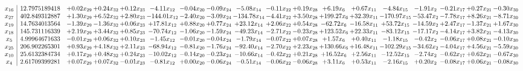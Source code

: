 \documentclass[9pt]{article}
\begin{document}
 \[\begin{array}{c| c c@{\hskip 2pt} c@{\hskip 2pt} c@{\hskip 2pt} c@{\hskip 2pt} c@{\hskip 2pt} c@{\hskip 2pt} c@{\hskip 2pt} c@{\hskip 2pt} c@{\hskip 2pt} c@{\hskip 2pt} c@{\hskip 2pt} c@{\hskip 2pt} c@{\hskip 2pt} c@{\hskip 2pt} c@{\hskip 2pt} c@{\hskip 2pt} }
 x_{16}   &  12.7975189418 & +  0.02 x_{29} & +  0.24 x_{32} & +  0.12 x_{23} & -4.11 x_{12} & -0.04 x_{20} & -0.09 x_{24} & -5.08 x_{14} & -0.11 x_{22} & +  0.19 x_{28} & +  6.19 x_{6} & +  0.67 x_{11} & -4.84 x_{15} & -1.91 x_{2} & -0.21 x_{17} & +  0.27 x_{21} & -0.30 x_{30}\\
 x_{27}   &  402.849312887 & +  1.30 x_{29} & +  6.52 x_{32} & +  2.80 x_{23} & -144.01 x_{12} & -2.40 x_{20} & -3.09 x_{24} & -134.78 x_{14} & -4.41 x_{22} & +  3.50 x_{28} & + 199.27 x_{6} & + 32.39 x_{11} & -170.97 x_{15} & -53.47 x_{2} & -7.78 x_{17} & +  8.26 x_{21} & -8.71 x_{30}\\
 x_{19}   &  14.7634013564 & -1.39 x_{29} & -1.36 x_{32} & +  0.06 x_{23} & + 17.81 x_{12} & +  0.88 x_{20} & +  0.77 x_{24} & + 23.12 x_{14} & +  2.06 x_{22} & +  0.54 x_{28} & -62.72 x_{6} & -16.58 x_{11} & + 53.72 x_{15} & -14.59 x_{2} & +  2.47 x_{17} & -1.37 x_{21} & +  1.67 x_{30}\\
 x_{18}   &  145.731116339 & +  2.19 x_{29} & +  3.44 x_{32} & +  0.85 x_{23} & -70.74 x_{12} & -1.06 x_{20} & -1.59 x_{24} & -49.23 x_{14} & -2.71 x_{22} & -0.23 x_{28} & + 123.52 x_{6} & + 22.33 x_{11} & -83.12 x_{15} & -17.17 x_{2} & -4.14 x_{17} & +  3.82 x_{21} & -4.13 x_{30}\\
 x_{5}   &  4.99964671633 & -0.01 x_{29} & +  0.06 x_{32} & +  0.10 x_{23} & -1.45 x_{12} & -0.01 x_{20} & -0.04 x_{24} & -1.79 x_{14} & -0.07 x_{22} & +  0.07 x_{28} & +  1.57 x_{6} & +  0.40 x_{11} & -1.18 x_{15} & -0.42 x_{2} & -0.06 x_{17} & +  0.08 x_{21} & -0.10 x_{30}\\
 x_{25}   &  206.902265301 & +  0.93 x_{29} & +  4.18 x_{32} & +  2.11 x_{23} & -68.94 x_{12} & -0.81 x_{20} & -1.76 x_{24} & -92.40 x_{14} & -2.70 x_{22} & +  2.23 x_{28} & + 130.66 x_{6} & + 16.48 x_{11} & -102.29 x_{15} & -34.62 x_{2} & -4.04 x_{17} & +  4.56 x_{21} & -5.59 x_{30}\\
 x_{10}   &  25.6132384734 & +  0.17 x_{29} & +  0.48 x_{32} & +  0.24 x_{23} & -10.02 x_{12} & -0.14 x_{20} & -0.23 x_{24} & -10.66 x_{14} & -0.42 x_{22} & +  0.21 x_{28} & + 16.52 x_{6} & +  2.56 x_{11} & -12.52 x_{15} & -2.74 x_{2} & -0.62 x_{17} & +  0.62 x_{21} & -0.67 x_{30}\\
 x_{4}   &  2.61709399281 & +  0.07 x_{29} & +  0.07 x_{32} & -0.01 x_{23} & -0.81 x_{12} & +  0.00 x_{20} & -0.06 x_{24} & -0.51 x_{14} & -0.06 x_{22} & -0.06 x_{28} & +  3.11 x_{6} & +  0.53 x_{11} & -2.16 x_{15} & +  0.20 x_{2} & -0.08 x_{17} & +  0.06 x_{21} & -0.08 x_{30}\\

\end{array}\]
\end{document}
